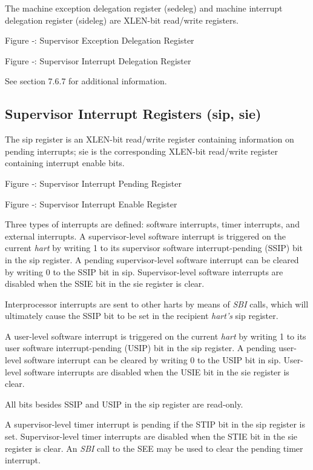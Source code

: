 The machine exception delegation register (sedeleg) and machine
interrupt delegation register (sideleg) are XLEN-bit read/write
registers.

\missingfigure{}

Figure ‑: Supervisor Exception Delegation Register

\missingfigure{}

Figure ‑: Supervisor Interrupt Delegation Register

See section 7.6.7 for additional information.

\subsection{Supervisor Interrupt Registers (sip, sie)}

The sip register is an XLEN-bit read/write register containing
information on pending interrupts; sie is the corresponding XLEN-bit
read/write register containing interrupt enable bits.

\missingfigure{}

Figure ‑: Supervisor Interrupt Pending Register

\missingfigure{}

Figure ‑: Supervisor Interrupt Enable Register

Three types of interrupts are defined: software interrupts, timer
interrupts, and external interrupts. A supervisor-level software
interrupt is triggered on the current \emph{hart} by writing 1 to its
supervisor software interrupt-pending (SSIP) bit in the sip register. A
pending supervisor-level software interrupt can be cleared by writing 0
to the SSIP bit in sip. Supervisor-level software interrupts are
disabled when the SSIE bit in the sie register is clear.

Interprocessor interrupts are sent to other harts by means of \emph{SBI}
calls, which will ultimately cause the SSIP bit to be set in the
recipient \emph{hart's} sip register.

A user-level software interrupt is triggered on the current \emph{hart}
by writing 1 to its user software interrupt-pending (USIP) bit in the
sip register. A pending user-level software interrupt can be cleared by
writing 0 to the USIP bit in sip. User-level software interrupts are
disabled when the USIE bit in the sie register is clear.

All bits besides SSIP and USIP in the sip register are read-only.

A supervisor-level timer interrupt is pending if the STIP bit in the sip
register is set. Supervisor-level timer interrupts are disabled when the
STIE bit in the sie register is clear. An \emph{SBI} call to the SEE may
be used to clear the pending timer interrupt.

